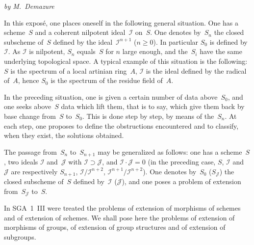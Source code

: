 \label{III}

\begin{center}
\textit{by M.~Demazure}
\end{center}

{\renewcommand{\thefootnote}{(0)}}%
In this expos\'e, one places oneself in the following general situation.
One has a scheme~\(S\) and a coherent nilpotent ideal~\(\mathcal{I}\)
on~\(S\). One denotes by~\(S_n\) the closed subscheme of~\(S\) defined
by the ideal~\(\mathcal{I}^{n+1}\) (\(n\geqslant 0\)). In particular
\(S_0\) is defined by~\(\mathcal{I}\). As \(\mathcal{I}\) is nilpotent,
\(S_n\) equals~\(S\) for \(n\) large enough, and the~\(S_i\) have the same
underlying topological space. A typical example of this situation is the
following: \(S\) is the spectrum of a local artinian ring~\(A\),
\(\mathcal{I}\) is the ideal defined by the radical of~\(A\), hence
\(S_0\) is the spectrum of the residue field of~\(A\).

In the preceding situation, one is given a certain number of data
above~\(S_0\), and one seeks above~\(S\) data which lift them, that is to
say, which give them back by base change from~\(S\) to~\(S_0\). This is
done step by step, by means of the~\(S_n\). At each step, one proposes
to define the obstructions encountered and to classify, when they exist,
the solutions obtained.

The passage from~\(S_n\) to~\(S_{n+1}\) may be generalized as follows:
one has a scheme~\(S\), two ideals \(\mathcal{I}\) and~\(\mathcal{J}\)
with \(\mathcal{I}\supset\mathcal{J}\), and
\(\mathcal{I}\cdot\mathcal{J}=0\) (in the preceding case, \(S\),
\(\mathcal{I}\) and~\(\mathcal{J}\) are respectively \(S_{n+1}\),
\(\mathcal{I}/\mathcal{I}^{n+2}\),
\(\mathcal{I}^{n+1}/\mathcal{I}^{n+2}\)). One denotes by~\(S_0\)
(\resp \(S_{\mathcal{J}}\)) the closed subscheme of~\(S\) defined
by~\(\mathcal{I}\) (\resp \(\mathcal{J}\)), and one poses a problem of
extension from~\(S_{\mathcal{J}}\) to~\(S\).

In SGA~1~III were treated the problems of extension of morphisms of
schemes and of extension of schemes. We shall pose here the problems of
extension of morphisms of groups, of extension of group structures and
of extension of subgroups.

